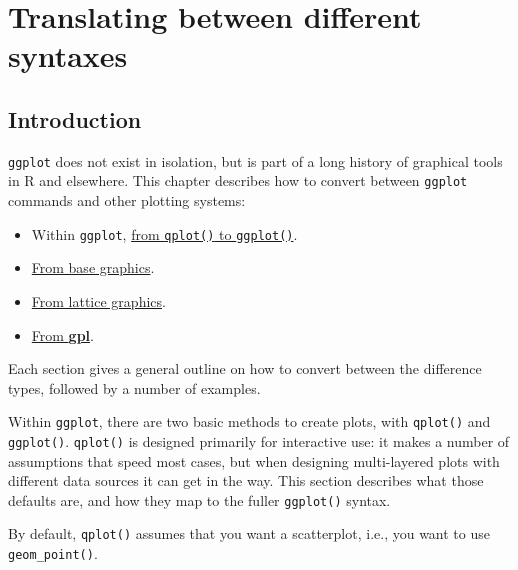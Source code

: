 \chapter{Translating between different syntaxes}\label{cha:translating}

\section{Introduction}

\texttt{ggplot} does not exist in isolation, but is part of a long
history of graphical tools in R and elsewhere. This chapter describes
how to convert between \texttt{ggplot} commands and other plotting
systems:

\begin{itemize}
\itemsep1pt\parskip0pt
\item
  Within \texttt{ggplot}, \hyperref[sec:qplot-ggplot]{from
  \texttt{qplot()} to \texttt{ggplot()}}.
\item
  \hyperref[sec:translate-base]{From base graphics}.
\item
  \hyperref[sec:translate-lattice]{From lattice graphics}.
\item
  \hyperref[sec:translate-gpl]{From \textbf{gpl}}.
\end{itemize}

Each section gives a general outline on how to convert between the
difference types, followed by a number of examples.


Within \texttt{ggplot}, there are two basic methods to create plots,
with \texttt{qplot()} and \texttt{ggplot()}. \texttt{qplot()} is
designed primarily for interactive use: it makes a number of assumptions
that speed most cases, but when designing multi-layered plots with
different data sources it can get in the way. This section describes
what those defaults are, and how they map to the fuller
\texttt{ggplot()} syntax.
 

By default, \texttt{qplot()} assumes that you want a scatterplot, i.e.,
you want to use \texttt{geom\_point()}.

